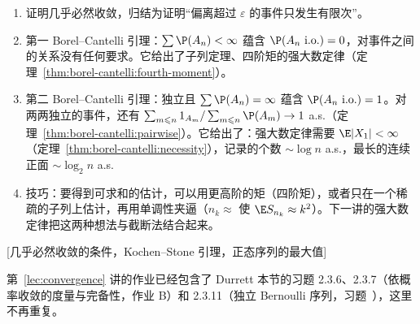 
\begin{enumerate}
\item 证明几乎必然收敛，归结为证明“偏离超过 $\varepsilon$ 的事件只发生有限次”。
\item 第一 Borel--Cantelli 引理：$\sum \P(A_n)<\infty$ 蕴含 $\P(A_n\ \text{i.o.})=0$，对事件之间的关系没有任何要求。它给出了子列定理、四阶矩的强大数定律（定理~\ref{thm:borel-cantelli:fourth-moment}）。
\item 第二 Borel--Cantelli 引理：独立且 $\sum \P(A_n)=\infty$ 蕴含 $\P(A_n\ \text{i.o.})=1$。对两两独立的事件，还有 $\sum_{m\leqslant n}\one_{A_m}/\sum_{m\leqslant n}\P(A_m)\to1$ a.s.（定理~\ref{thm:borel-cantelli:pairwise}）。它给出了：强大数定律需要 $\E\abs{X_1}<\infty$（定理~\ref{thm:borel-cantelli:necessity}），记录的个数 $\sim\log n$ a.s.，最长的连续正面 $\sim\log_2n$ a.s.
\item 技巧：要得到可求和的估计，可以用更高阶的矩（四阶矩），或者只在一个稀疏的子列上估计，再用单调性夹逼（$n_k\approx$ 使 $\E S_{n_k}\approx k^2$）。下一讲的强大数定律把这两种想法与截断法结合起来。
\end{enumerate}

[几乎必然收敛的条件，Kochen–Stone 引理，正态序列的最大值]
\label{hw:borel-cantelli}


第~\ref{lec:convergence} 讲的作业已经包含了 Durrett 本节的习题 2.3.6、2.3.7（依概率收敛的度量与完备性，作业 B）和 2.3.11（独立 Bernoulli 序列，习题~），这里不再重复。


